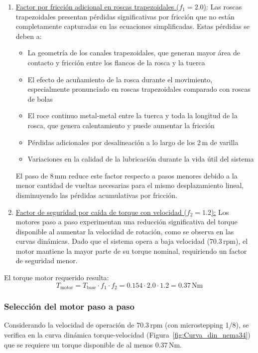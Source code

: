 \begin{enumerate}
    \item \underline{Factor por fricción adicional en roscas trapezoidales ($f_1 = 2.0$)}: Las roscas trapezoidales presentan pérdidas significativas por fricción que no están completamente capturadas en las ecuaciones simplificadas. Estas pérdidas se deben a:
    \begin{itemize}[label=$\bullet$]
        \item La geometría de los canales trapezoidales, que generan mayor área de contacto y fricción entre los flancos de la rosca y la tuerca
        \item El efecto de acuñamiento de la rosca durante el movimiento, especialmente pronunciado en roscas trapezoidales comparado con roscas de bolas
        \item El roce continuo metal-metal entre la tuerca y toda la longitud de la rosca, que genera calentamiento y puede aumentar la fricción
        \item Pérdidas adicionales por desalineación a lo largo de los 2\,m de varilla
        \item Variaciones en la calidad de la lubricación durante la vida útil del sistema
    \end{itemize}
    El paso de 8\,mm reduce este factor respecto a pasos menores debido a la menor cantidad de vueltas necesarias para el mismo desplazamiento lineal, disminuyendo las pérdidas acumulativas por fricción.

    \item \underline{Factor de seguridad por caída de torque con velocidad ($f_2 = 1.2$):} Los motores paso a paso experimentan una reducción significativa del torque disponible al aumentar la velocidad de rotación, como se observa en las curvas dinámicas. Dado que el sistema opera a baja velocidad (70.3\,rpm), el motor mantiene la mayor parte de su torque nominal, requiriendo un factor de seguridad menor.
\end{enumerate}

El torque motor requerido resulta:
\begin{equation}
T_{\text{motor}} = T_{\text{base}} \cdot f_1 \cdot f_2 = 0.154 \cdot 2.0 \cdot 1.2 = 0.37\,\text{Nm}
\label{eq:torque_motor_vertical}
\end{equation}

\subsubsection{Selección del motor paso a paso}
Considerando la velocidad de operación de 70.3\,rpm (con microstepping 1/8), se verifica en la curva dinámica torque-velocidad (Figura~\ref{fig:Curva_din_nema34}) que se requiere un torque disponible de al menos 0.37\,Nm.

